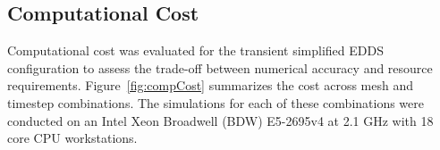 


\subsection{Computational Cost}
Computational cost was evaluated for the transient simplified EDDS configuration to assess the trade-off between numerical accuracy and resource requirements. Figure~\ref{fig:compCost} summarizes the cost across mesh and timestep combinations. The simulations for each of these combinations were conducted on an Intel Xeon Broadwell (BDW) E5-2695v4 at 2.1 GHz with 18 core CPU workstations. 

